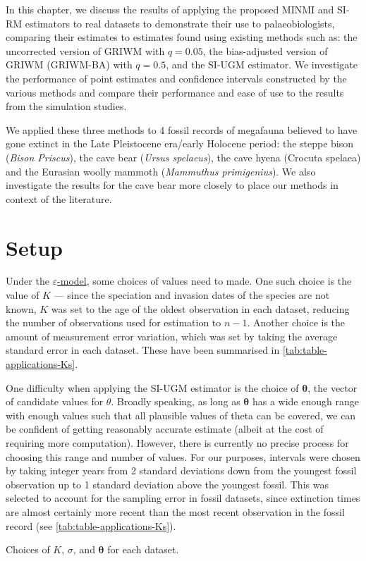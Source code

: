 
In this chapter, we discuss the results of applying the proposed MINMI and SI-RM estimators to real datasets to demonstrate their use to palaeobiologists, comparing their estimates to estimates found using existing methods such as: the uncorrected version of GRIWM with $q=0.05$, the bias-adjusted version of GRIWM (GRIWM-BA) with $q=0.5$, and the SI-UGM estimator. We investigate the performance of point estimates and confidence intervals constructed by the various methods and compare their performance and ease of use to the results from the simulation studies.

We applied these three methods to 4 fossil records of megafauna believed to have gone extinct in the Late Pleistocene era/early Holocene period: the steppe bison (\textit{Bison Priscus}), the cave bear (\textit{Ursus spelaeus}), the cave hyena (Crocuta spelaea) and the Eurasian woolly mammoth (\textit{Mammuthus primigenius}). We also investigate the results for the cave bear more closely to place our methods in context of the literature.

\section{Setup}

Under the \hyperref[model: measurement-error]{$\varepsilon$-model}, some choices of values need to made. One such choice is the value of $K$ --- since the speciation and invasion dates of the species are not known, $K$ was set to the age of the oldest observation in each dataset, reducing the number of observations used for estimation to $n-1$. Another choice is the amount of measurement error variation, which was set by taking the average standard error in each dataset. These have been summarised in \autoref{tab:table-applications-Ks}.

One difficulty when applying the SI-UGM estimator is the choice of $\bm{\theta}$, the vector of candidate values for $\theta$. Broadly speaking, as long as $\bm{\theta}$ has a wide enough range with enough values such that all plausible values of theta can be covered, we can be confident of getting reasonably accurate estimate (albeit at the cost of requiring more computation). However, there is currently no precise process for choosing this range and number of values. For our purposes, intervals were chosen by taking integer years from 2 standard deviations down from the youngest fossil observation up to 1 standard deviation above the youngest fossil. This was selected to account for the sampling error in fossil datasets, since extinction times are almost certainly more recent than the most recent observation in the fossil record (see \autoref{tab:table-applications-Ks}).
\begin{table}[ht]
    \centering
    \vspace{-6mm}
    \caption{Choices of $K$, $\sigma$, and $\bm{\theta}$ for each dataset.}
    
    \label{tab:table-applications-Ks}
    \vspace{-4mm}
\end{table}


